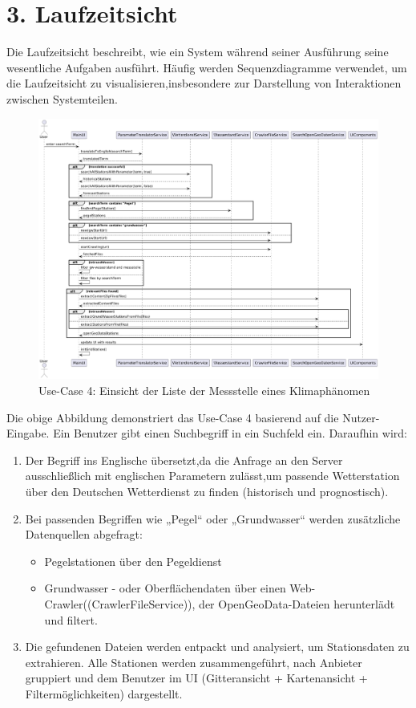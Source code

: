 \documentclass[a4paper,12pt]{scrreprt}
\begin{document}
\section*{\large \textbf{3. Laufzeitsicht}}
Die Laufzeitsicht beschreibt, wie ein System während seiner Ausführung seine wesentliche Aufgaben ausführt. Häufig werden Sequenzdiagramme verwendet, um die Laufzeitsicht zu visualisieren,insbesondere zur Darstellung von Interaktionen zwischen Systemteilen.
\begin{figure}[H]
	\includegraphics[width=18.5cm]{Such-Algorithmus.png}
	\caption{\label{} Use-Case 4: Einsicht der Liste der Messstelle eines Klimaphänomen}
\end{figure}
Die obige Abbildung demonstriert das Use-Case 4 basierend auf die Nutzer-Eingabe. Ein Benutzer gibt einen Suchbegriff in ein Suchfeld ein. Daraufhin wird:  
\begin{enumerate}
	\item Der Begriff ins Englische übersetzt,da die Anfrage an den Server ausschließlich mit englischen Parametern zulässt,um passende Wetterstation über den Deutschen Wetterdienst zu finden (historisch und prognostisch).
	\item Bei passenden Begriffen wie „Pegel“ oder „Grundwasser“ werden zusätzliche Datenquellen abgefragt:
	\begin{itemize}
		\item Pegelstationen über den Pegeldienst
		\item Grundwasser - oder Oberflächendaten über einen Web-Crawler((CrawlerFileService)), der OpenGeoData-Dateien herunterlädt und filtert.
	\end{itemize}
	\item Die gefundenen Dateien werden entpackt und analysiert, um Stationsdaten zu extrahieren. Alle Stationen werden zusammengeführt, nach Anbieter gruppiert und dem Benutzer im UI (Gitteransicht + Kartenansicht + Filtermöglichkeiten) dargestellt.
\end{enumerate}
\end{document}
